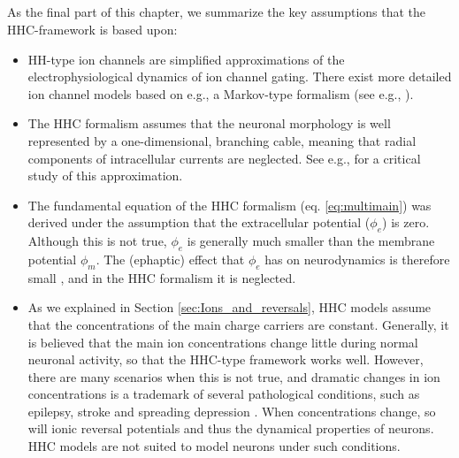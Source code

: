 \subsection{}
As the final part of this chapter, we summarize the key assumptions that the HHC-framework is based upon:

\begin{itemize}
\item HH-type ion channels are simplified approximations of the electrophysiological dynamics of ion channel gating. There exist more detailed ion channel models based on e.g., a Markov-type formalism (see e.g., \cite{Destexhe1994, balbi2017}). 

\item The HHC formalism assumes that the neuronal morphology is well represented by a one-dimensional, branching cable, meaning that radial components of intracellular currents are neglected. See e.g.,\cite{lindsay2004maxwell} for a critical study of this approximation.

\item The fundamental equation of the HHC formalism (eq. \ref{eq:multimain}) was derived under the assumption that the extracellular potential ($\phi_e$) is zero. Although this is not true, $\phi_e$ is generally much smaller than the membrane potential $\phi_m$. The (ephaptic) effect that $\phi_e$ has on neurodynamics is therefore small \cite{anastassiou2015}, and in the HHC formalism it is neglected.

\item As we explained in Section \ref{sec:Ions_and_reversals}, HHC models assume that the concentrations of the main charge carriers are constant. Generally, it is believed that the main ion concentrations change little during normal neuronal activity, so that the HHC-type framework works well. However, there are many scenarios when this is not true, and dramatic changes in ion concentrations is a trademark of several pathological conditions, such as epilepsy, stroke and spreading depression \cite{Somjen2001, Zandt2015, Ayata2015}. When concentrations change, so will ionic reversal potentials and thus the dynamical properties of neurons. HHC models are not suited to model neurons under such conditions.

\end{itemize}

